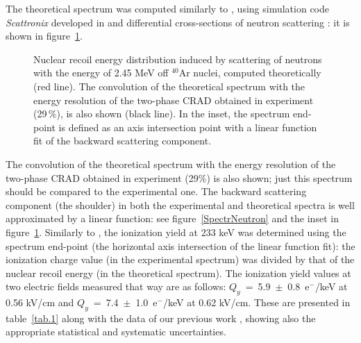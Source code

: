 \documentclass[a4paper,11pt]{article}
\begin{document}
The theoretical  spectrum was computed similarly to  \cite{IonYield14}, using simulation code {\it
Scattronix} developed in \cite{NSpectr} and differential cross-sections of neutron scattering \cite{NData}: it is shown in
figure~\ref{SpectrTheory}.
\begin{figure}[ht!]
	\caption{Nuclear recoil energy distribution induced by scattering of
			neutrons with the energy of 2.45 MeV off $^{40}$Ar nuclei, computed
			theoretically (red line). The convolution of the theoretical
			spectrum with the energy resolution of the two-phase CRAD obtained
			in experiment (29\,\%), is also shown (black line). In the inset, the spectrum end-point is defined as an axis intersection point with a linear function fit of the backward scattering component.}
	\label{SpectrTheory}
\end{figure}
The convolution of the theoretical spectrum with the energy resolution of the two-phase CRAD obtained in experiment (29\%) is also shown; just this spectrum should be
compared to the experimental one.  The backward scattering component (the shoulder) in both the experimental and theoretical spectra is well approximated by a linear function: see figure~\ref{SpectrNeutron} and the inset in figure~\ref{SpectrTheory}.
Similarly to  \cite{IonYield14}, the ionization yield at 233 keV was determined using the spectrum end-point (the horizontal axis intersection of the linear function fit): the ionization charge value (in the experimental spectrum) was divided by that of the nuclear recoil energy (in the theoretical spectrum).
The ionization yield values at two electric fields measured that way are as follows: $Q_y$~=~5.9~$\pm$~0.8~e$^-$/keV at 0.56 kV/cm and $Q_y$~=~7.4~$\pm$~1.0~e$^-$/keV at 0.62 kV/cm. These are presented in table~\ref{tab.1} along with the data of our previous work \cite{IonYield14}, showing also the appropriate statistical and systematic uncertainties.
\end{document}
